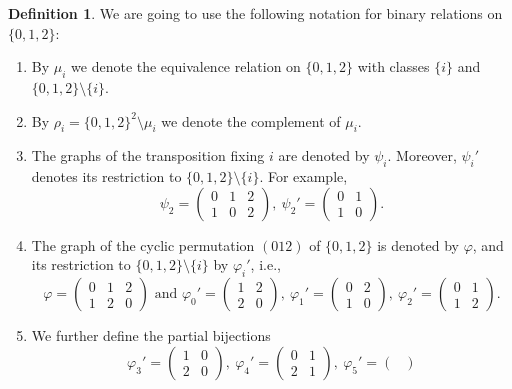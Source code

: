 \documentclass[12pt]{amsart}
\theoremstyle{definition}
\theoremstyle{definition}
\newtheorem{definition}[theorem]{Definition}
\begin{document}
\begin{definition} \label{definition:newnotation}
We are going to use the following notation for binary relations on $\{0,1,2\}$:
\begin{enumerate}
\item By $\mu_i$ we denote the equivalence relation on $\{0,1,2\}$ with classes $\{i\}$ and $\{0,1,2\} \setminus \{i\}$.
\item By $\rho_i = \{0,1,2\}^2\setminus \mu_i$ we denote the complement of $\mu_i$.
\item The graphs of the transposition fixing $i$ are denoted by $\psi_i$. Moreover, $\psi_i'$ denotes its restriction to $\{0,1,2\}\setminus \{i\}$. For example,
$$\psi_2 = \begin{pmatrix}
    0 & 1 & 2 \\
    1 & 0 & 2
  \end{pmatrix},\ \psi_2' = \begin{pmatrix}
    0 & 1  \\
    1 & 0 
  \end{pmatrix}.$$
\item The graph of the cyclic permutation $(012)$ of $\{0,1,2\}$ is denoted by $\varphi$, and its restriction to $\{0,1,2\}\setminus \{i\}$ by $\varphi_i'$, i.e.,
$$\varphi = \begin{pmatrix}
    0 & 1 & 2 \\
    1 & 2 & 0
  \end{pmatrix} \text{ and } \varphi_0' = \begin{pmatrix}
    1 & 2 \\
    2 & 0
  \end{pmatrix},\ \varphi_1' = \begin{pmatrix}
    0 & 2 \\
    1 & 0
  \end{pmatrix},\ \varphi_2' = \begin{pmatrix}
    0 & 1 \\
    1 & 2
  \end{pmatrix}.$$
\item We further define the partial bijections
$$\varphi_3' = \begin{pmatrix}
    1 & 0  \\
    2 & 0 
  \end{pmatrix},\ \varphi_4' = \begin{pmatrix}
    0 & 1  \\
    2 & 1 
  \end{pmatrix},\ \varphi_5' = \begin{pmatrix}

\end{pmatrix}$$
\end{enumerate}
\end{definition}
\end{document}
